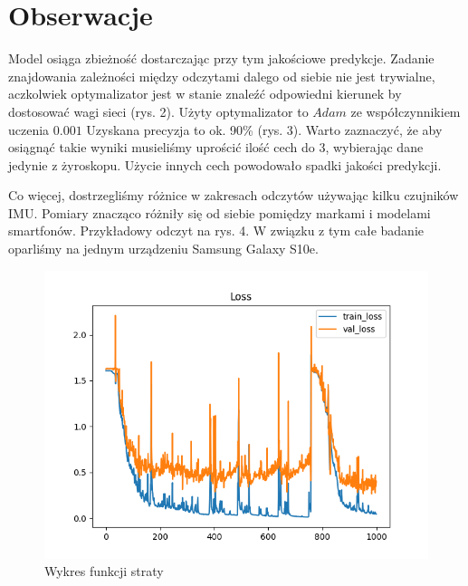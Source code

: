 \documentclass[10pt]{article}
\begin{document}
\section{Obserwacje}

Model osiąga zbieżność dostarczając przy tym jakościowe predykcje. Zadanie znajdowania zależności między odczytami dalego od siebie nie jest trywialne, aczkolwiek optymalizator jest w stanie znaleźć odpowiedni kierunek by dostosować wagi sieci (rys. 2).
Użyty optymalizator to $Adam$ ze współczynnikiem uczenia $0.001$
 Uzyskana precyzja to ok. 90\% (rys. 3). Warto zaznaczyć, że aby osiągnąć takie wyniki musieliśmy uprościć ilość cech do 3, wybierając dane jedynie z żyroskopu. Użycie innych cech powodowało spadki jakości predykcji.

Co więcej, dostrzegliśmy różnice w zakresach odczytów używając kilku czujników IMU. Pomiary znacząco różniły się od siebie pomiędzy markami i modelami smartfonów. Przykładowy odczyt na rys. 4. W związku z tym całe badanie oparliśmy na jednym urządzeniu Samsung Galaxy S10e.

\begin{figure}
  \includegraphics[width=13cm]{loss.png}
  \centering
  \caption{Wykres funkcji straty}
\end{figure}
\end{document}
